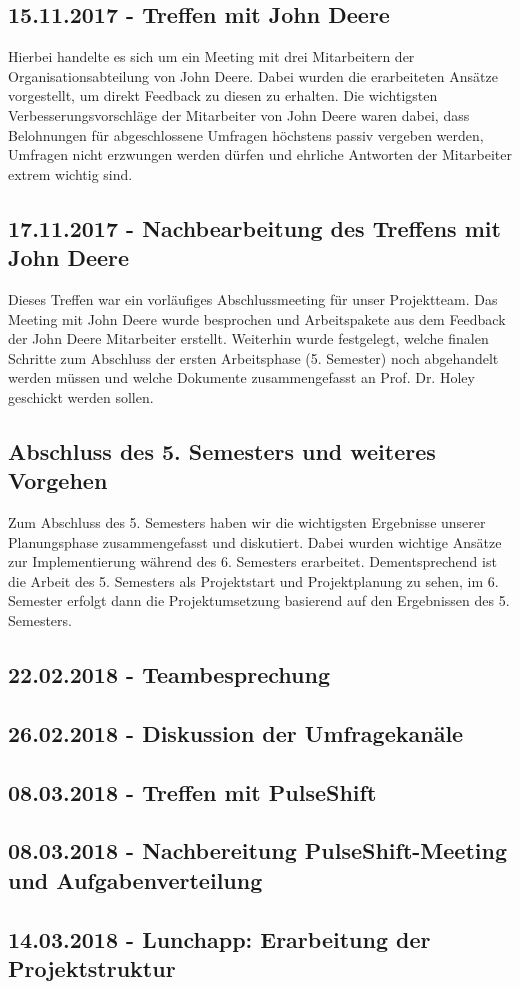 \subsection{15.11.2017 - Treffen mit John Deere}
Hierbei handelte es sich um ein Meeting mit drei Mitarbeitern der Organisationsabteilung von John Deere. Dabei wurden die erarbeiteten Ansätze vorgestellt, um direkt Feedback zu diesen zu erhalten. Die wichtigsten Verbesserungsvorschläge der Mitarbeiter von John Deere waren dabei, dass Belohnungen für abgeschlossene Umfragen höchstens passiv vergeben werden, Umfragen nicht erzwungen werden dürfen und ehrliche Antworten der Mitarbeiter extrem wichtig sind.

\subsection{17.11.2017 - Nachbearbeitung des Treffens mit John Deere}
Dieses Treffen war ein vorläufiges Abschlussmeeting für unser Projektteam. Das Meeting mit John Deere wurde besprochen und Arbeitspakete aus dem Feedback der John Deere Mitarbeiter erstellt. Weiterhin wurde festgelegt, welche finalen Schritte zum Abschluss der ersten Arbeitsphase (5. Semester) noch abgehandelt werden müssen und welche Dokumente zusammengefasst an Prof. Dr. Holey geschickt werden sollen.

\subsection{Abschluss des 5. Semesters und weiteres Vorgehen}
Zum Abschluss des 5. Semesters haben wir die wichtigsten Ergebnisse unserer Planungsphase zusammengefasst und diskutiert. Dabei wurden wichtige Ansätze zur Implementierung während des 6. Semesters erarbeitet. Dementsprechend ist die Arbeit des 5. Semesters als Projektstart und Projektplanung zu sehen, im 6. Semester erfolgt dann die Projektumsetzung basierend auf den Ergebnissen des 5. Semesters.

\subsection{22.02.2018 - Teambesprechung}

\subsection{26.02.2018 - Diskussion der Umfragekanäle}

\subsection{08.03.2018 - Treffen mit PulseShift}

\subsection{08.03.2018 - Nachbereitung PulseShift-Meeting und Aufgabenverteilung}

\subsection{14.03.2018 - Lunchapp: Erarbeitung der Projektstruktur}